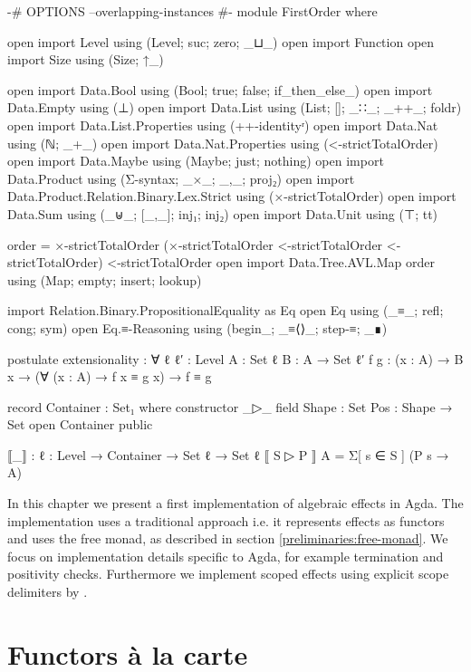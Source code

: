 \begin{code}[hide]
{-# OPTIONS --overlapping-instances #-}
module FirstOrder where

open import Level using (Level; suc; zero; _⊔_)
open import Function
open import Size using (Size; ↑_)

open import Data.Bool using (Bool; true; false; if_then_else_)
open import Data.Empty using (⊥)
open import Data.List using (List; []; _∷_; _++_; foldr)
open import Data.List.Properties using (++-identityʳ)
open import Data.Nat using (ℕ; _+_)
open import Data.Nat.Properties using (<-strictTotalOrder)
open import Data.Maybe using (Maybe; just; nothing)
open import Data.Product using (Σ-syntax; _×_; _,_; proj₂)
open import Data.Product.Relation.Binary.Lex.Strict using (×-strictTotalOrder)
open import Data.Sum using (_⊎_; [_,_]; inj₁; inj₂)
open import Data.Unit using (⊤; tt)

order = ×-strictTotalOrder (×-strictTotalOrder <-strictTotalOrder <-strictTotalOrder) <-strictTotalOrder
open import Data.Tree.AVL.Map order using (Map; empty; insert; lookup)

import Relation.Binary.PropositionalEquality as Eq
open Eq using (_≡_; refl; cong; sym)
open Eq.≡-Reasoning using (begin_; _≡⟨⟩_; step-≡; _∎)

postulate
  extensionality : ∀ {ℓ ℓ′ : Level} {A : Set ℓ} {B : A → Set ℓ′} {f g : (x : A) → B x}
      → (∀ (x : A) → f x ≡ g x) → f ≡ g

record Container : Set₁ where
  constructor _▷_
  field
    Shape : Set
    Pos : Shape → Set
open Container public

⟦_⟧ : {ℓ : Level} → Container → Set ℓ → Set ℓ
⟦ S ▷ P ⟧ A = Σ[ s ∈ S ] (P s → A)
\end{code}

In this chapter we present a first implementation of algebraic effects in Agda.
The implementation uses a traditional approach i.e. it represents effects as
functors and uses the free monad, as described in section
\ref{preliminaries:free-monad}.
We focus on implementation details specific to Agda, for example termination and
positivity checks.
Furthermore we implement scoped effects using explicit scope delimiters by
\textcite{DBLP:conf/haskell/WuSH14}.


\section{Functors {\`{a}} la carte}
\label{first-order:functor}

